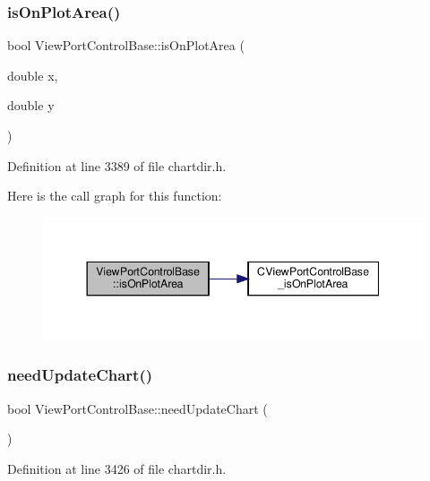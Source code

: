 \subsubsection{\texorpdfstring{is\+On\+Plot\+Area()}{isOnPlotArea()}}
{\footnotesize\ttfamily bool View\+Port\+Control\+Base\+::is\+On\+Plot\+Area (\begin{DoxyParamCaption}\item[{double}]{x,  }\item[{double}]{y }\end{DoxyParamCaption})\hspace{0.3cm}{\ttfamily [inline]}}



Definition at line 3389 of file chartdir.\+h.

Here is the call graph for this function\+:
\nopagebreak
\begin{figure}[H]
\begin{center}
\leavevmode
\includegraphics[width=344pt]{class_view_port_control_base_affc7aa4c21872bb06c51665c3a65e565_cgraph}
\end{center}
\end{figure}
\mbox{\label{class_view_port_control_base_a7d15bce14cf6b575b446df8ca7d8e24c}} 
\subsubsection{\texorpdfstring{need\+Update\+Chart()}{needUpdateChart()}}
{\footnotesize\ttfamily bool View\+Port\+Control\+Base\+::need\+Update\+Chart (\begin{DoxyParamCaption}{ }\end{DoxyParamCaption})\hspace{0.3cm}{\ttfamily [inline]}}



Definition at line 3426 of file chartdir.\+h.

